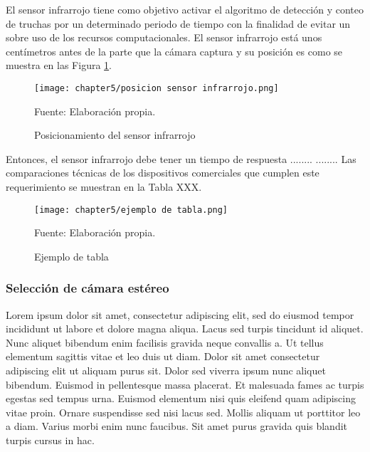 El sensor infrarrojo tiene como objetivo activar el algoritmo de detección y conteo de truchas por un determinado periodo de tiempo con la finalidad de evitar un sobre uso de los recursos computacionales. El sensor infrarrojo está unos centímetros antes de la parte que la cámara captura y su posición es como se muestra en las Figura \ref{fig:posicion sensor infrarrojo}.

\begin{figure}[H]
	\centering
	\texttt{[image: chapter5/posicion sensor infrarrojo.png]}
	\caption{Posicionamiento del sensor infrarrojo}
	\begin{myflushleftportland}
		Fuente: Elaboración propia.
	\end{myflushleftportland}
	\label{fig:posicion sensor infrarrojo}
\end{figure}

Entonces, el sensor infrarrojo debe tener un tiempo de respuesta ........ ........ Las comparaciones técnicas de los dispositivos comerciales que cumplen este requerimiento se muestran en la Tabla XXX.

\begin{figure}[H]
	\centering
	\texttt{[image: chapter5/ejemplo de tabla.png]}
	\caption{Ejemplo de tabla}
	\begin{myflushleftportland}
		Fuente: Elaboración propia.
	\end{myflushleftportland}
	\label{fig:ejemplo de tabla}
\end{figure}

\subsubsection{Selección de cámara estéreo} %
\label{sssec:seleccion de camara estereo}

Lorem ipsum dolor sit amet, consectetur adipiscing elit, sed do eiusmod tempor incididunt ut labore et dolore magna aliqua. Lacus sed turpis tincidunt id aliquet. Nunc aliquet bibendum enim facilisis gravida neque convallis a. Ut tellus elementum sagittis vitae et leo duis ut diam. Dolor sit amet consectetur adipiscing elit ut aliquam purus sit. Dolor sed viverra ipsum nunc aliquet bibendum. Euismod in pellentesque massa placerat. Et malesuada fames ac turpis egestas sed tempus urna. Euismod elementum nisi quis eleifend quam adipiscing vitae proin. Ornare suspendisse sed nisi lacus sed. Mollis aliquam ut porttitor leo a diam. Varius morbi enim nunc faucibus. Sit amet purus gravida quis blandit turpis cursus in hac.

